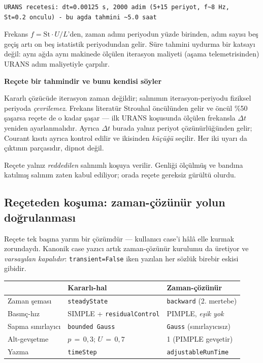 \documentclass[11pt,a4paper]{article}
\newcommand{\kkkenar}{lacivert}
\newcommand{\kkzemin}{kod}
\newenvironment{renkkutu}[3]{%
  \renewcommand{\kkkenar}{#1}\renewcommand{\kkzemin}{#2}%
  \par\medskip\noindent
  \begin{lrbox}{\kutugovde}%
  \begin{minipage}{\dimexpr\linewidth-2\fboxsep-2\fboxrule\relax}\footnotesize
  \textcolor{#1}{\textbf{#3}}\par\vspace{3pt}%
}{%
  \end{minipage}%
  \end{lrbox}%
  \noindent\fcolorbox{\kkkenar}{\kkzemin}{\usebox{\kutugovde}}%
  \par\medskip
}
\newenvironment{dikkat}[1]{\begin{renkkutu}{orta}{ortabg}{#1}}{\end{renkkutu}}
\begin{document}
\begin{lstlisting}
URANS recetesi: dt=0.00125 s, 2000 adim (5+15 periyot, f~8 Hz,
St=0.2 onculu) - bu agda tahmini ~5.0 saat
\end{lstlisting}

\noindent Frekans $f = \mathrm{St}\cdot U/L$'den, zaman adımı periyodun yüzde
birinden, adım sayısı beş geçiş artı on beş istatistik periyodundan gelir. Süre
tahmini uydurma bir katsayı değil: aynı ağda aynı makinede ölçülen iterasyon
maliyeti (aşama telemetrisinden) URANS adım maliyetiyle çarpılır.

\begin{dikkat}{Reçete bir tahmindir ve bunu kendisi söyler}
Kararlı çözücüde iterasyon zaman değildir; salınımın iterasyon-periyodu
fiziksel periyoda \emph{çevrilemez}. Frekans literatür Strouhal öncülünden
gelir ve öncül \%50 şaşarsa reçete de o kadar şaşar --- ilk URANS koşusunda
ölçülen frekansla $\Delta t$ yeniden ayarlanmalıdır. Ayrıca $\Delta t$ burada
yalnız periyot çözünürlüğünden gelir; Courant kısıtı ayrıca kontrol edilir ve
ikisinden \emph{küçüğü} seçilir. Her iki uyarı da çıktının parçasıdır, dipnot
değil.
\end{dikkat}

\noindent Reçete yalnız \emph{reddedilen} salınımlı koşuya verilir. Genliği
ölçülmüş ve bandına katılmış salınım zaten kabul ediliyor; orada reçete
gereksiz gürültü olurdu.

\subsection{Reçeteden koşuma: zaman-çözünür yolun doğrulanması}

Reçete tek başına yarım bir çözümdür --- kullanıcı case'i hâlâ elle kurmak
zorundaydı. Kanonik case yazıcı artık zaman-çözünür kurulumu da üretiyor ve
\emph{varsayılan kapalıdır}: \texttt{transient=False} iken yazılan her sözlük
birebir eskisi gibidir.

\begin{center}\footnotesize
\begin{tabular}{@{}lll@{}}
\toprule
& \textbf{Kararlı-hal} & \textbf{Zaman-çözünür} \\
\midrule
Zaman şeması & \texttt{steadyState} & \texttt{backward} (2. mertebe) \\
Basınç-hız & SIMPLE + \texttt{residualControl} & PIMPLE, \emph{eşik yok} \\
Sapma sınırlayıcı & \texttt{bounded Gauss} & \texttt{Gauss} (sınırlayıcısız) \\
Alt-gevşetme & $p\,{=}\,0{,}3$; $U\,{=}\,0{,}7$ & 1 (PIMPLE gevşetir) \\
Yazma & \texttt{timeStep} & \texttt{adjustableRunTime} \\
\bottomrule
\end{tabular}
\end{center}
\end{document}
